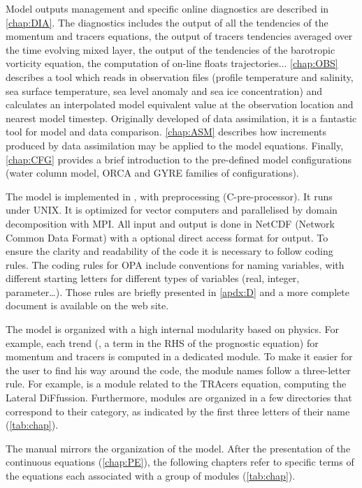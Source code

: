 \documentclass[../main/NEMO_manual]{subfiles}
\begin{document}

Model outputs management and specific online diagnostics are described in \autoref{chap:DIA}.
The diagnostics includes the output of all the tendencies of the momentum and tracers equations,
the output of tracers tendencies averaged over the time evolving mixed layer,
the output of the tendencies of the barotropic vorticity equation,
the computation of on-line floats trajectories...
\autoref{chap:OBS} describes a tool which reads in observation files
(profile temperature and salinity, sea surface temperature, sea level anomaly and sea ice concentration) 
and calculates an interpolated model equivalent value at the observation location and nearest model timestep.
Originally developed of data assimilation, it is a fantastic tool for model and data comparison.
\autoref{chap:ASM} describes how increments produced by data assimilation may be applied to the model equations.
Finally, \autoref{chap:CFG} provides a brief introduction to the pre-defined model configurations
(water column model, ORCA and GYRE families of configurations).

The model is implemented in \fninety, with preprocessing (C-pre-processor).
It runs under UNIX.
It is optimized for vector computers and parallelised by domain decomposition with MPI.
All input and output is done in NetCDF (Network Common Data Format) with a optional direct access format for output.
To ensure the clarity and readability of the code it is necessary to follow coding rules.
The coding rules for OPA include conventions for naming variables,
with different starting letters for different types of variables (real, integer, parameter\ldots).
Those rules are briefly presented in \autoref{apdx:D} and a more complete document is available on
the \NEMO web site.

The model is organized with a high internal modularity based on physics.
For example, each trend (\ie, a term in the RHS of the prognostic equation) for momentum and tracers
is computed in a dedicated module.
To make it easier for the user to find his way around the code, the module names follow a three-letter rule.
For example,  is a module related to the TRAcers equation, computing the Lateral DiFfussion. 
Furthermore, modules are organized in a few directories that correspond to their category,
as indicated by the first three letters of their name (\autoref{tab:chap}).

The manual mirrors the organization of the model.
After the presentation of the continuous equations (\autoref{chap:PE}),
the following chapters refer to specific terms of the equations each associated with
a group of modules (\autoref{tab:chap}).
\end{document}
